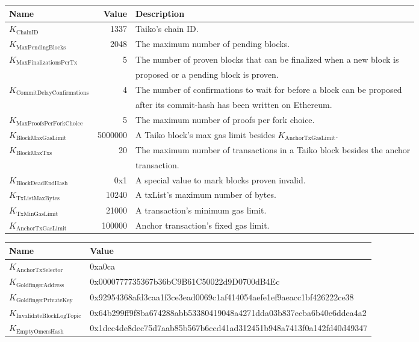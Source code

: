 \documentclass[9pt,oneside]{amsart}
\begin{document}
\begin{tabu}{l r l}
\toprule
Name & Value & Description \\
\midrule
$K_{\mathrm{ChainID}}$ & 1337 & Taiko's chain ID. \\
$K_{\mathrm{MaxPendingBlocks}}$ & 2048 & The maximum number of pending blocks. \\
$K_{\mathrm{MaxFinalizationsPerTx}}$ & 5 & The number of proven blocks that can be finalized when a new block is\\
& & proposed or a pending block is proven. \\
$K_{\mathrm{CommitDelayConfirmations}}$ & 4 & The number of confirmations to wait for before a block can be proposed\\
& &  after its commit-hash has been written on Ethereum.\\
$K_{\mathrm{MaxProofsPerForkChoice}}$ & 5 & The maximum number of proofs per fork choice. \\
$K_{\mathrm{BlockMaxGasLimit}}$ & 5000000 & A Taiko block's max gas limit besides $K_{\mathrm{AnchorTxGasLimit}}$.  \\
$K_{\mathrm{BlockMaxTxs}}$ & 20 & The maximum number of transactions in a Taiko block besides the anchor\\
& & transaction. \\
$K_{\mathrm{BlockDeadEndHash}}$ & 0x1 & A special value to mark blocks proven invalid. \\
$K_{\mathrm{TxListMaxBytes}}$ & 10240 & A txList's maximum number of bytes. \\
$K_{\mathrm{TxMinGasLimit}}$ & 21000 & A transaction's minimum gas limit. \\
$K_{\mathrm{AnchorTxGasLimit}}$ & 100000 & Anchor transaction's fixed gas limit. \\
\bottomrule
\end{tabu}

\begin{tabu}{l l}
\toprule
Name &  \quad \quad Value \\
\midrule
$K_{\mathrm{AnchorTxSelector}}$ &  \quad \quad 0xa0ca \\
$K_{\mathrm{GoldfingerAddress}}$ &  \quad \quad 0x0000777735367b36bC9B61C50022d9D0700dB4Ec  \\
$K_{\mathrm{GoldfingerPrivateKey}}$ & \quad \quad 0x92954368afd3caa1f3ce3ead0069c1af414054aefe1ef9aeacc1bf426222ce38 \\
$K_{\mathrm{InvalidateBlockLogTopic}}$ & \quad \quad 0x64b299ff9f8ba674288abb53380419048a4271dda03b837ecba6b40e6ddea4a2 \\
$K_{\mathrm{EmptyOmersHash}}$ & \quad \quad 0x1dcc4de8dec75d7aab85b567b6ccd41ad312451b948a7413f0a142fd40d49347   \quad \quad \quad \quad \\
\bottomrule
\end{tabu}
\end{document}
